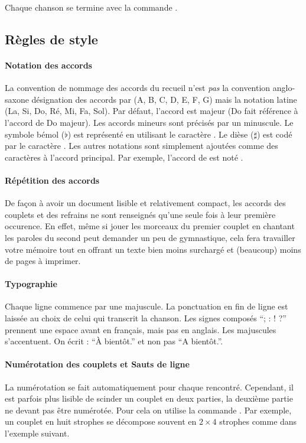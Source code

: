 \documentclass[versionenligne]{patacrep}
\begin{document}
Chaque chanson se termine avec la commande .

\subsection{Règles de style}

\paragraph{Notation des accords}
La convention de nommage des accords du recueil n'est \emph{pas} la
convention anglo-saxone désignation des accords par (A, B, C, D, E, F,
G) mais la notation latine (La, Si, Do, Ré, Mi, Fa, Sol). Par défaut,
l'accord est majeur (Do fait référence à l'accord de Do majeur). Les
accords mineurs sont précisés par un  minuscule.  Le
symbole bémol ($\flat$) est représenté en utilisant le caractère
\command{\&}.  Le dièse ($\sharp$) est codé par le caractère
\command{\#}. Les autres notations sont simplement ajoutées comme des
caractères à l'accord principal. Par exemple, l'accord de  est noté \latexcom{[La\&m]}.

\paragraph{Répétition des accords}
De façon à avoir un document lisible et relativement compact, les
accords des couplets et des refrains ne sont renseignés qu'une seule
fois à leur première occurence. En effet, même si jouer les morceaux
du premier couplet en chantant les paroles du second peut demander un
peu de gymnastique, cela fera travailler votre mémoire tout en offrant
un texte bien moins surchargé et (beaucoup) moins de pages à imprimer.

\paragraph{Typographie}
Chaque ligne commence par une majuscule. La ponctuation en fin de
ligne est laissée au choix de celui qui transcrit la chanson.  Les
signes composés ``; : ! ?'' prennent une espace avant en français,
mais pas en anglais. Les majuscules s'accentuent. On écrit : ``À
bientôt.'' et non pas ``A bientôt.''.

\paragraph{Numérotation des couplets et Sauts de ligne}
La numérotation se fait automatiquement pour chaque
 rencontré. Cependant, il est parfois plus
lisible de scinder un couplet en deux parties, la deuxième partie ne
devant pas être numérotée. Pour cela on utilise la commande
. Par exemple, un couplet en huit strophes se
décompose souvent en $2 \times 4$ strophes comme dans l'exemple
suivant.
\end{document}
